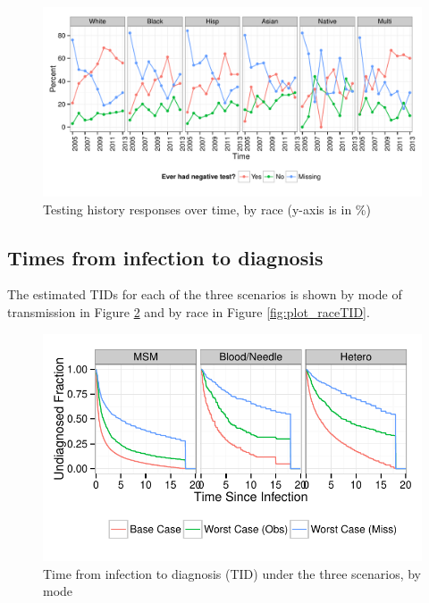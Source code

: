 \documentclass{article}\usepackage[]{graphicx}\usepackage[]{color}
\makeatletter
\def\maxwidth{ %
  \ifdim\Gin@nat@width>\linewidth
    \linewidth
  \else
    \Gin@nat@width
  \fi
}
\newenvironment{knitrout}{}{} %
\makeatother
\begin{document}
\begin{knitrout}\footnotesize
{}\color{fgcolor}\begin{figure}[hb]


{\centering \includegraphics[width=\maxwidth]{figure/minimal-plot_racetime} 

}

\caption[Testing history responses over time, by race (y-axis is in \%)]{Testing history responses over time, by race (y-axis is in \%)\label{fig:plot_racetime}}
\end{figure}


\end{knitrout}


\subsection{Times from infection to diagnosis}
\label{sec:TIDBySubgroup}
The estimated TIDs for each of the three scenarios is shown by mode of transmission in Figure \ref{fig:plot_modeTID} and by race in Figure \ref{fig:plot_raceTID}.

\begin{knitrout}\footnotesize
{}\color{fgcolor}\begin{figure}[hb]


{\centering \includegraphics[width=\maxwidth]{figure/minimal-plot_modeTID} 

}

\caption[Time from infection to diagnosis (TID) under the three scenarios, by mode]{Time from infection to diagnosis (TID) under the three scenarios, by mode\label{fig:plot_modeTID}}
\end{figure}


\end{knitrout}
\end{document}
